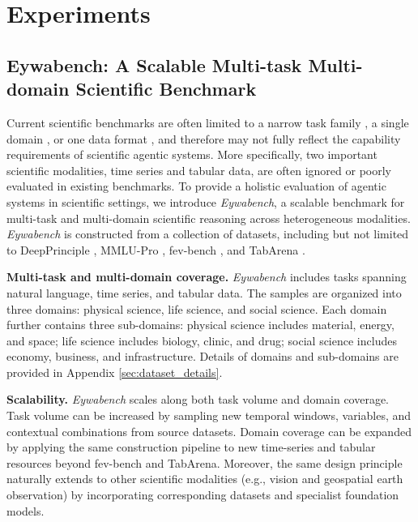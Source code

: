 \section{Experiments}
\label{sec:experiment}


\subsection{Eywabench: A Scalable Multi-task Multi-domain Scientific Benchmark}

Current scientific benchmarks are often limited to a narrow task family \cite{DBLP:journals/corr/WuRFGGPLP17, DBLP:journals/corr/abs-2502-14739}, a single domain \cite{DBLP:conf/emnlp/DaiYSZGHLZTGH25, DBLP:conf/emnlp/DaiYSZGHLZTGH25, DBLP:journals/corr/abs-2504-16074}, or one data format \cite{DBLP:journals/corr/abs-2505-19501, DBLP:journals/corr/abs-2507-03578, DBLP:conf/nips/JohnsonFGMBSF23, DBLP:conf/cvpr/0004WGWWCML0Z0025}, and therefore may not fully reflect the capability requirements of scientific agentic systems.
More specifically, two important scientific modalities, time series and tabular data, are often ignored or poorly evaluated in existing benchmarks.
To provide a holistic evaluation of agentic systems in scientific settings, we introduce \textit{Eywabench}, a scalable benchmark for multi-task and multi-domain scientific reasoning across heterogeneous modalities.
\textit{Eywabench} is constructed from a collection of datasets, including but not limited to DeepPrinciple \cite{song2025evaluating}, MMLU-Pro \cite{wang2024mmlu}, fev-bench \cite{DBLP:journals/corr/abs-2509-26468}, and TabArena \cite{DBLP:journals/corr/abs-2506-16791}.

\textbf{Multi-task and multi-domain coverage.} \textit{Eywabench} includes tasks spanning natural language, time series, and tabular data. The samples are organized into three domains: physical science, life science, and social science.
Each domain further contains three sub-domains: physical science includes material, energy, and space; life science includes biology, clinic, and drug; social science includes economy, business, and infrastructure.
Details of domains and sub-domains are provided in Appendix \ref{sec:dataset_details}.

\textbf{Scalability.} \textit{Eywabench} scales along both task volume and domain coverage.
Task volume can be increased by sampling new temporal windows, variables, and contextual combinations from source datasets.
Domain coverage can be expanded by applying the same construction pipeline to new time-series and tabular resources beyond fev-bench and TabArena. Moreover, the same design principle naturally extends to other scientific modalities (e.g., vision and geospatial earth observation) by incorporating corresponding datasets and specialist foundation models.

